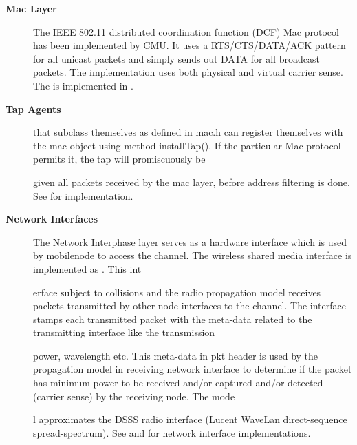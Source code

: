 \begin{description}
\item[{\bf Mac Layer}] The IEEE 802.11 distributed coordination 
function (DCF) Mac protocol has been implemented by CMU. It uses a 
RTS/CTS/DATA/ACK pattern for all unicast packets and simply sends out
 DATA for all broadcast packets. The implementation uses both 
physical and virtual carrier sense. The  is implemented in .

\item[{\bf Tap Agents}]  that subclass themselves as  defined in mac.h can register themselves with the mac object using method installTap(). If the particular Mac protocol permits it, the tap will promiscuously be 









given all packets received by the mac layer, before address filtering is done. See  for  implementation.

\item[{\bf Network Interfaces}] The Network Interphase layer serves as a hardware interface which is used by mobilenode to access the channel. The wireless shared media interface is implemented as . This int









erface subject to collisions and the radio propagation model receives packets transmitted by other node interfaces to the channel. The interface stamps each transmitted packet with the meta-data related to the transmitting interface like the transmission 









power, wavelength etc. This meta-data in pkt header is used by the propagation model in receiving network interface to determine if the packet has minimum power to be received and/or captured and/or detected (carrier sense) by the receiving node. The mode









l approximates the DSSS radio interface (Lucent WaveLan direct-sequence spread-spectrum). See  and  for network interface implementations.


\end{description}
